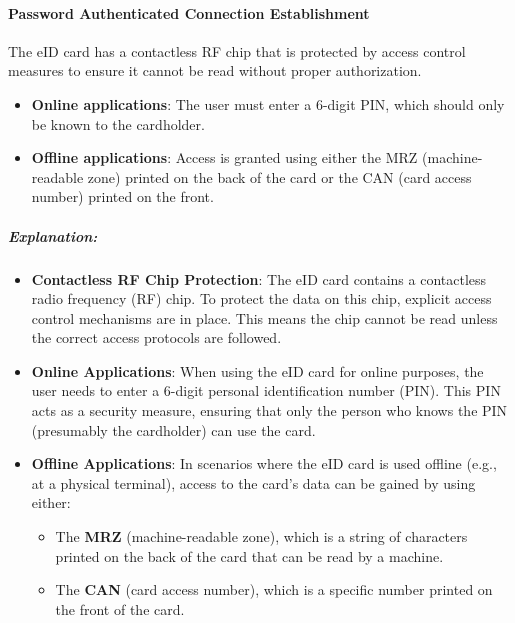 \documentclass{article}
\begin{document}
                            \paragraph{Password Authenticated Connection Establishment}

                            The eID card has a contactless RF chip that is protected by access control measures to ensure it cannot be read without proper authorization.

                            \begin{itemize}
                                \item \textbf{Online applications}: The user must enter a 6-digit PIN, which should only be known to the cardholder.
                                \item \textbf{Offline applications}: Access is granted using either the MRZ (machine-readable zone) printed on the back of the card or the CAN (card access number) printed on the front.
                            \end{itemize}
                            \vspace{10pt}
                            \subparagraph{Explanation:}
                            \begin{itemize}
                                \item \textbf{Contactless RF Chip Protection}: The eID card contains a contactless radio frequency (RF) chip. To protect the data on this chip, explicit access control mechanisms are in place. This means the chip cannot be read unless the correct access protocols are followed.
                                
                                \item \textbf{Online Applications}: When using the eID card for online purposes, the user needs to enter a 6-digit personal identification number (PIN). This PIN acts as a security measure, ensuring that only the person who knows the PIN (presumably the cardholder) can use the card.
                                
                                \item \textbf{Offline Applications}: In scenarios where the eID card is used offline (e.g., at a physical terminal), access to the card's data can be gained by using either:
                                \begin{itemize}
                                    \item The \textbf{MRZ} (machine-readable zone), which is a string of characters printed on the back of the card that can be read by a machine.
                                    \item The \textbf{CAN} (card access number), which is a specific number printed on the front of the card.
                                \end{itemize}
                            \end{itemize}
\end{document}
